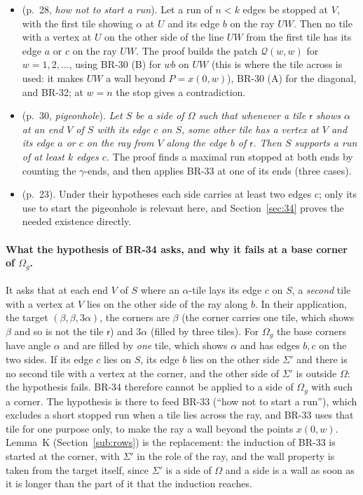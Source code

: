 \documentclass[11pt,reqno]{amsart}
\theoremstyle{plain}
\theoremstyle{definition}
\begin{document}
\begin{itemize}
\item[\textbf{BR-33}] (p.~28, \emph{how not to start a run}). Let a run of $n<k$ edges be stopped at $V$, with the first tile showing $\alpha$ at $U$ and its edge $b$ on the ray $UW$. Then no tile with a vertex at $U$ on the other side of the line $UW$ from the first tile has its edge $a$ or $c$ on the ray $UW$. The proof builds the patch $\mathcal Q(w,w)$ for $w=1,2,\dots$, using BR-30 (B) for $wb$ on $UW$ (this is where the tile across is used: it makes $UW$ a wall beyond $P=x(0,w)$), BR-30 (A) for the diagonal, and BR-32; at $w=n$ the stop gives a contradiction.
\item[\textbf{BR-34}] (p.~30, \emph{pigeonhole}). \emph{Let $S$ be a side of $\Omega$ such that whenever a tile $\mathsf r$ shows $\alpha$ at an end $V$ of $S$ with its edge $c$ on $S$, some other tile has a vertex at $V$ and its edge $a$ or $c$ on the ray from $V$ along the edge $b$ of $\mathsf r$. Then $S$ supports a run of at least $k$ edges $c$.} The proof finds a maximal run stopped at both ends by counting the $\gamma$-ends, and then applies BR-33 at one of its ends (three cases).
\item[\textbf{BR-31}] (p.~23). Under their hypotheses each side carries at least two edges $c$; only its use to start the pigeonhole is relevant here, and Section~\ref{sec:34} proves the needed existence directly.
\end{itemize}
\paragraph{What the hypothesis of BR-34 asks, and why it fails at a base corner of $\Omega_{g}$.} It asks that at each end $V$ of $S$ where an $\alpha$-tile lays its edge $c$ on $S$, a \emph{second} tile with a vertex at $V$ lies on the other side of the ray along $b$. In their application, the target $(\beta,\beta,3\alpha)$, the corners are $\beta$ (the corner carries one tile, which shows $\beta$ and so is not the tile $\mathsf r$) and $3\alpha$ (filled by three tiles). For $\Omega_{g}$ the base corners have angle $\alpha$ and are filled by \emph{one} tile, which shows $\alpha$ and has edges $b,c$ on the two sides. If its edge $c$ lies on $S$, its edge $b$ lies on the other side $\Sigma'$ and there is no second tile with a vertex at the corner, and the other side of $\Sigma'$ is outside $\Omega$: the hypothesis fails. BR-34 therefore cannot be applied to a side of $\Omega_{g}$ with such a corner. The hypothesis is there to feed BR-33 (``how not to start a run''), which excludes a short stopped run when a tile lies across the ray, and BR-33 uses that tile for one purpose only, to make the ray a wall beyond the points $x(0,w)$. Lemma~K (Section~\ref{sub:rows}) is the replacement: the induction of BR-33 is started at the corner, with $\Sigma'$ in the role of the ray, and the wall property is taken from the target itself, since $\Sigma'$ is a side of $\Omega$ and a side is a wall as soon as it is longer than the part of it that the induction reaches.
\end{document}
